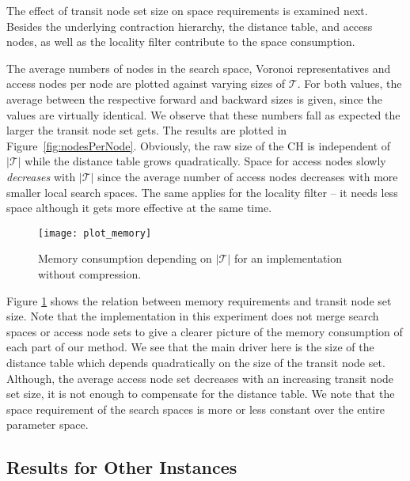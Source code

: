 \documentclass{llncs}
\begin{document}
The effect of transit node set size on space requirements is examined next.
Besides the underlying contraction hierarchy, the distance table, and access nodes, as well as the locality filter contribute to the space consumption.

The average numbers of nodes in the search space, Voronoi representatives and access nodes per node are plotted against varying sizes of $\mathcal{T}$.
For both values, the average between the respective forward and backward sizes is given, since the values are virtually identical.
We observe that these numbers fall as expected the larger the transit node set gets.
The results are plotted in Figure~\ref{fig:nodesPerNode}.
Obviously, the raw size of the CH is independent of $\vert\mathcal{T}\vert$ while the distance table grows quadratically. 
Space for access nodes slowly \emph{decreases} with $\vert\mathcal{T}\vert$ since the average number of access nodes decreases with more smaller local search spaces.
The same applies for the locality filter -- it needs less space although it gets more effective at the same time.

\begin{figure}[hbt]
    \centering
    \texttt{[image: plot\_memory]}
    \caption{Memory consumption depending on $\vert\mathcal{T}\vert$ for an implementation without compression.}
    \label{fig:tnr-plotMemoryUncompressed}
\end{figure}

Figure \ref{fig:tnr-plotMemoryUncompressed} shows the relation between memory requirements and transit node set size.
Note that the implementation in this experiment does not merge search spaces or access node sets to give a clearer picture of the memory consumption of each part of our method.
We see that the main driver here is the size of the distance table which depends quadratically on the size of the transit node set.
Although, the average access node set decreases with an increasing transit node set size, it is not enough to compensate for the distance table.
We note that the space requirement of the search spaces is more or less constant over the entire parameter space.


\subsection{Results for Other Instances}\label{sec:tnr-otherInstances}
\end{document}
